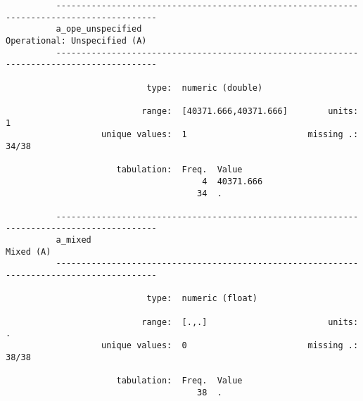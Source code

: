 \documentclass{article}
\begin{document}
\begin{verbatim}
          ------------------------------------------------------------------------------------------
          a_ope_unspecified                                             Operational: Unspecified (A)
          ------------------------------------------------------------------------------------------
          
                            type:  numeric (double)
          
                           range:  [40371.666,40371.666]        units:  1
                   unique values:  1                        missing .:  34/38
          
                      tabulation:  Freq.  Value
                                       4  40371.666
                                      34  .
          
          ------------------------------------------------------------------------------------------
          a_mixed                                                                          Mixed (A)
          ------------------------------------------------------------------------------------------
          
                            type:  numeric (float)
          
                           range:  [.,.]                        units:  .
                   unique values:  0                        missing .:  38/38
          
                      tabulation:  Freq.  Value
                                      38  .
          
          
          
          
          
          
\end{verbatim}
\end{document}
